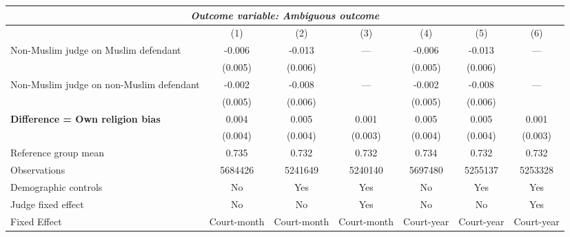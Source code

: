 {
\def\sym#1{\ifmmode^{#1}\else\(^{#1}\)\fi}
\begin{tabular}{l*{6}{c}}
  \hline\hline
\multicolumn{7}{c}{\textit{Outcome variable: Ambiguous outcome}}\\
\hline
&\multicolumn{1}{c}{(1)}&\multicolumn{1}{c}{(2)}&\multicolumn{1}{c}{(3)}&\multicolumn{1}{c}{(4)}&\multicolumn{1}{c}{(5)}&\multicolumn{1}{c}{(6)}\\
\hline
Non-Muslim judge on Muslim defendant \hspace{15mm}& -0.006 & -0.013 & --- & -0.006 & -0.013 & --- \\
& (0.005) & (0.006) &  & (0.005) &(0.006) &  \\
Non-Muslim judge on non-Muslim defendant \hspace{15mm}& -0.002 & -0.008 & ---& -0.002 & -0.008 & --- \\
& (0.005) & (0.006) &  & (0.005) & (0.006) &  \\
\textbf{Difference = Own religion bias} & 0.004 & 0.005 & 0.001 & 0.005 & 0.005 & 0.001 \\
& (0.004) & (0.004) & (0.003) & (0.004) & (0.004) & (0.003) \\
\hline
Reference group mean & 0.735 & 0.732 & 0.732 & 0.734 & 0.732 & 0.732 \\
Observations & 5684426 & 5241649 & 5240140 & 5697480 & 5255137 & 5253328 \\
Demographic controls & No & Yes & Yes & No & Yes & Yes \\
Judge fixed effect & No & No & Yes & No & No & Yes \\
Fixed Effect & Court-month & Court-month & Court-month & Court-year & Court-year & Court-year \\
\hline\hline
\end{tabular}
}
 
